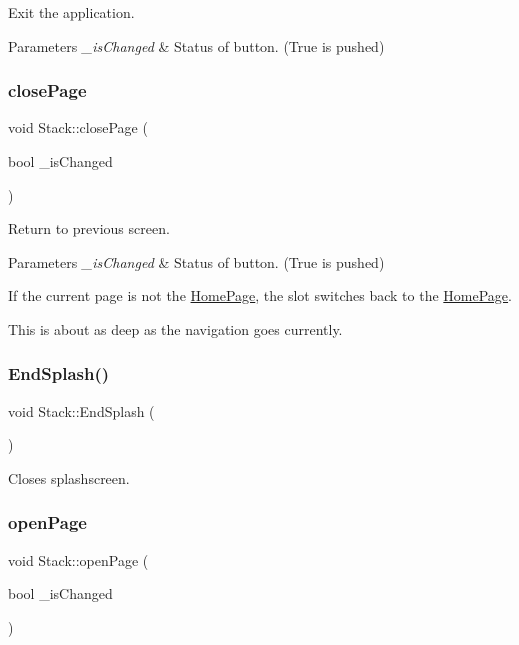 Exit the application. 
\begin{DoxyParams}{Parameters}
{\em \+\_\+is\+Changed} & Status of button. (True is pushed) \\
\hline
\end{DoxyParams}
\mbox{\label{classStack_a69cd464c336cb480ad54ac2c83c309e1}} 
\subsubsection{\texorpdfstring{closePage}{closePage}}
{\footnotesize\ttfamily void Stack\+::close\+Page (\begin{DoxyParamCaption}\item[{bool}]{\+\_\+is\+Changed }\end{DoxyParamCaption})\hspace{0.3cm}{\ttfamily [slot]}}

Return to previous screen. 
\begin{DoxyParams}{Parameters}
{\em \+\_\+is\+Changed} & Status of button. (True is pushed)\\
\hline
\end{DoxyParams}
If the current page is not the \mbox{\hyperlink{classHomePage}{Home\+Page}}, the slot switches back to the \mbox{\hyperlink{classHomePage}{Home\+Page}}.

This is about as deep as the navigation goes currently. \mbox{\label{classStack_ac608632a7155f01a24a9713f5fde915e}} 
\subsubsection{\texorpdfstring{EndSplash()}{EndSplash()}}
{\footnotesize\ttfamily void Stack\+::\+End\+Splash (\begin{DoxyParamCaption}{ }\end{DoxyParamCaption})}

Closes splashscreen. \mbox{\label{classStack_a3663db1c1578aabe63286d4f2bb6fc6f}} 
\subsubsection{\texorpdfstring{openPage}{openPage}}
{\footnotesize\ttfamily void Stack\+::open\+Page (\begin{DoxyParamCaption}\item[{bool}]{\+\_\+is\+Changed }\end{DoxyParamCaption})\hspace{0.3cm}{\ttfamily [slot]}}

